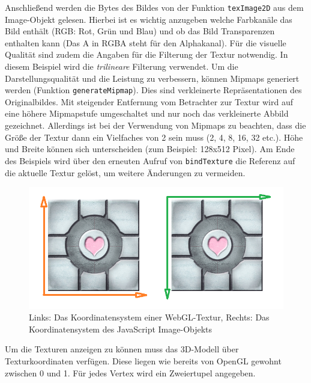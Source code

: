 Anschließend werden die Bytes des Bildes von der Funktion \texttt{texImage2D} aus dem Image-Objekt gelesen. Hierbei ist es wichtig anzugeben welche Farbkanäle das Bild enthält (RGB: Rot, Grün und Blau) und ob das Bild Transparenzen enthalten kann (Das A in RGBA steht für den Alphakanal). Für die visuelle Qualität sind zudem die Angaben für die Filterung der Textur notwendig. In diesem Beispiel wird die \textit{trilineare} Filterung verwendet. Um die Darstellungsqualität und die Leistung zu verbessern, können Mipmaps generiert werden (Funktion \texttt{generateMipmap}). Dies sind verkleinerte Repräsentationen des Originalbildes. Mit steigender Entfernung vom Betrachter zur Textur wird auf eine höhere Mipmapstufe umgeschaltet und nur noch das verkleinerte Abbild gezeichnet. Allerdings ist bei der Verwendung von Mipmaps zu beachten, dass die Größe der Textur dann ein Vielfaches von 2 sein muss (2, 4, 8, 16, 32 etc.). Höhe und Breite können sich unterscheiden (zum Beispiel: 128x512 Pixel). Am Ende des Beispiels wird über den erneuten Aufruf von \texttt{bindTexture} die Referenz auf die aktuelle Textur gelöst, um weitere Änderungen zu vermeiden.
\begin{figure}
\centering
\includegraphics[width=\textwidth]{bilder/koordinatensysteme_bilder.png}
\caption{Links: Das Koordinatensystem einer WebGL-Textur, Rechts: Das Koordinatensystem des JavaScript Image-Objekts}
\label{fig:bilderkoordinatensysteme}
\end{figure}

Um die Texturen anzeigen zu können muss das 3D-Modell über Texturkoordinaten verfügen. Diese liegen wie bereits von OpenGL gewohnt zwischen 0 und 1. Für jedes Vertex wird ein Zweiertupel angegeben.

